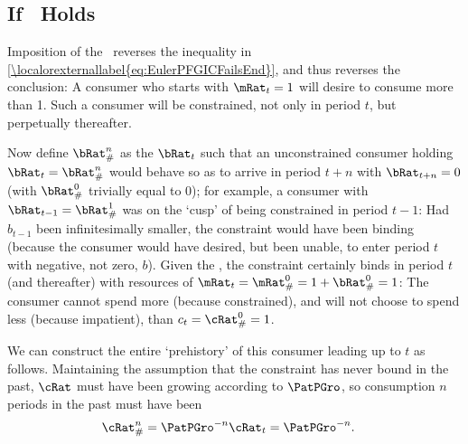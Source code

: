 \documentclass[../BufferStockTheory.tex]{subfiles}
\begin{document}
\subsection{If \PFGIC~Holds}

Imposition of the \PFGIC~reverses the inequality in
\eqref{\localorexternallabel{eq:EulerPFGICFailsEnd}}, and thus
reverses the conclusion: A consumer who starts with $\mRat_{t}=1$ will
desire to consume more than 1.  Such a consumer will be constrained,
not only in period $t$, but perpetually thereafter.

Now define $\bRat_{\#}^{n}$ as the $\bRat_{t}$ such that
an unconstrained consumer holding $\bRat_{t}=\bRat_{\#}^{n}$ would behave so as to arrive in period $t+n$ with $\bRat_{t+n}=0$ (with $\bRat_{\#}^{0}$ trivially equal to 0); for example, a consumer with $\bRat_{t-1}=\bRat_{\#}^{1}$ was on the `cusp' of being constrained in period
$t-1$: Had $b_{t-1}$ been infinitesimally smaller, the constraint
would have been binding (because the consumer would have desired, but
been unable, to enter period $t$ with negative, not zero, $b$).  Given
the \PFGIC, the constraint certainly binds in period $t$ (and
thereafter) with resources of
$\mRat_{t}=\mRat_{\#}^{0}=1+\bRat_{\#}^{0}=1$: The consumer cannot
spend more (because constrained), and will not choose to spend less
(because impatient), than $c_{t}=\cRat_{\#}^{0}=1$.

We can construct the entire `prehistory' of this consumer leading up to $t$ as follows.
Maintaining the assumption that the constraint has never bound in the past,
$\cRat$ must have been growing according to $\PatPGro$, so consumption $n$ periods in the past must have been
\begin{align}
  \cRat_{\#}^{n}  & = \PatPGro^{-n} \cRat_{t} = \PatPGro^{-n}. \label{eq:cPreHist}
\end{align}
\end{document}

